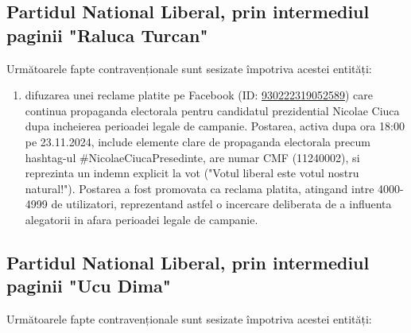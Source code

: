 \documentclass[a4paper,12pt]{article}
\begin{document}
\begin{enumerate}[leftmargin=*, label=\arabic*.)]
\end{enumerate}

\vspace{0.5cm}

\subsection{Partidul National Liberal, prin intermediul paginii "Raluca Turcan"}
Următoarele fapte contravenționale sunt sesizate împotriva acestei entități:

\begin{enumerate}[leftmargin=*, label=\arabic*.)]
    \item difuzarea unei reclame platite pe Facebook (ID: \href{https://www.facebook.com/ads/library/?id=930222319052589}{930222319052589}) care continua propaganda electorala pentru candidatul prezidential Nicolae Ciuca dupa incheierea perioadei legale de campanie. Postarea, activa dupa ora 18:00 pe 23.11.2024, include elemente clare de propaganda electorala precum hashtag-ul \#NicolaeCiucaPresedinte, are numar CMF (11240002), si reprezinta un indemn explicit la vot ("Votul liberal este votul nostru natural!"). Postarea a fost promovata ca reclama platita, atingand intre 4000-4999 de utilizatori, reprezentand astfel o incercare deliberata de a influenta alegatorii in afara perioadei legale de campanie.
\end{enumerate}

\vspace{0.5cm}

\subsection{Partidul National Liberal, prin intermediul paginii "Ucu Dima"}
Următoarele fapte contravenționale sunt sesizate împotriva acestei entități:
\end{document}
